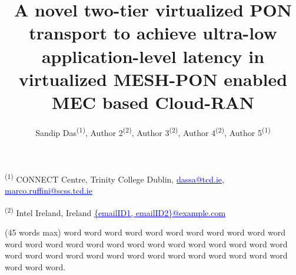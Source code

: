 \documentclass[a4paper, oneside, twocolumn, notitlepage, 10pt]{extarticle_ecoc}
\begin{document}


\title{A novel two-tier virtualized PON transport to achieve ultra-low application-level latency in virtualized MESH-PON enabled MEC based Cloud-RAN}%

\author{\vspace{-0.3in}
    Sandip Das\textsuperscript{(1)}, Author 2\textsuperscript{(2)},
    Author 3\textsuperscript{(2)}, Author 4\textsuperscript{(2)}, Author 5\textsuperscript{(1)}
}

\maketitle                  %


\begin{strip}
 \begin{author_descr}

   \textsuperscript{(1)} CONNECT Centre, Trinity College Dublin,
   \textcolor{blue}{\uline{dassa@tcd.ie}, \uline{marco.ruffini@scss.tcd.ie}}

   \textsuperscript{(2)} Intel Ireland, Ireland
   \textcolor{blue}{\uline{\{emailID1, emailID2\}@example.com}}
 \end{author_descr}
\vspace{-0.1in}
\end{strip}



\begin{strip}
  \begin{ecoc_abstract}
    (45 words max) word word word word word word word word word word word word word word word word word word word word word word word word word word word word word word word word word word word word word word word word word word.
  \end{ecoc_abstract}
\vspace*{-0.15in}
\end{strip}

\end{document}
